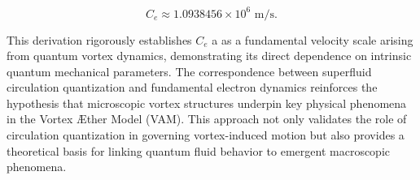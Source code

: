 \begin{equation*}
C_e \approx 1.0938456 \times 10^6 \text{ m/s}.
\end{equation*}

This derivation rigorously establishes  $ C_e $ a as a fundamental velocity scale arising from quantum vortex dynamics, demonstrating its direct
dependence on intrinsic quantum mechanical parameters. The correspondence between superfluid circulation quantization and fundamental electron dynamics reinforces the hypothesis that microscopic vortex structures underpin key physical phenomena in the Vortex Æther Model (VAM). This approach not only validates the role of circulation quantization in governing vortex-induced motion but also provides a theoretical basis for linking quantum fluid behavior to emergent macroscopic phenomena.